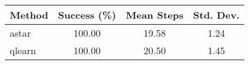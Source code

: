 \begin{tabular}{lccc}
\toprule
Method & Success (\%) & Mean Steps & Std. Dev. \\
\midrule
astar & 100.00 & 19.58 & 1.24 \\
qlearn & 100.00 & 20.50 & 1.45 \\
\bottomrule
\end{tabular}
